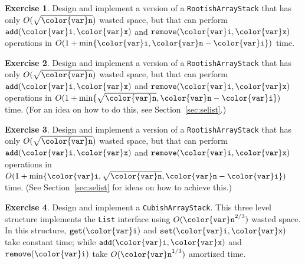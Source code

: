 \documentclass[10pt]{book}
\newcommand{\secref}[1]{Section~\ref{sec:#1}}
\theoremstyle{plain}
\theoremstyle{definition}
\newtheorem{exc}{Exercise}[chapter]
\newcommand{\exclabel}[1]{\label{exc:#1}}
\begin{document}
\begin{exc}
  Design and implement a version of a \texttt{RootishArrayStack} that has
  only $O(\sqrt{\ensuremath{\mathtt{{\color{var}n}}}})$ wasted space, but that can perform \ensuremath{\mathtt{add({\color{var}i},{\color{var}x})}}
  and \ensuremath{\mathtt{remove({\color{var}i},{\color{var}x})}} operations in $O(1+\min\{\ensuremath{\mathtt{{\color{var}i}}},\ensuremath{\mathtt{{\color{var}n}}}-\ensuremath{\mathtt{{\color{var}i}}}\})$ time.
\end{exc}

\begin{exc}\exclabel{rootisharraystack-fast}
  Design and implement a version of a \texttt{RootishArrayStack} that has
  only $O(\sqrt{\ensuremath{\mathtt{{\color{var}n}}}})$ wasted space, but that can perform \ensuremath{\mathtt{add({\color{var}i},{\color{var}x})}}
  and \ensuremath{\mathtt{remove({\color{var}i},{\color{var}x})}} operations in $O(1+\min\{\sqrt{\ensuremath{\mathtt{{\color{var}n}}}},\ensuremath{\mathtt{{\color{var}n}}}-\ensuremath{\mathtt{{\color{var}i}}}\})$
  time. (For an idea on how to do this, see \secref{selist}.)
\end{exc}

\begin{exc}
  Design and implement a version of a \texttt{RootishArrayStack} that has
  only $O(\sqrt{\ensuremath{\mathtt{{\color{var}n}}}})$ wasted space, but that can perform \ensuremath{\mathtt{add({\color{var}i},{\color{var}x})}} and
  \ensuremath{\mathtt{remove({\color{var}i},{\color{var}x})}} operations in $O(1+\min\{\ensuremath{\mathtt{{\color{var}i}}},\sqrt {\ensuremath{\mathtt{{\color{var}n}}}},\ensuremath{\mathtt{{\color{var}n}}}-\ensuremath{\mathtt{{\color{var}i}}}\})$ time.
  (See \secref{selist} for ideas on how to achieve this.)
\end{exc}

\begin{exc}
  Design and implement a \texttt{CubishArrayStack}.
  This three level structure
  implements the \texttt{List} interface using $O(\ensuremath{\mathtt{{\color{var}n}}}^{2/3})$ wasted space.
  In this structure, \ensuremath{\mathtt{get({\color{var}i})}} and \ensuremath{\mathtt{set({\color{var}i},{\color{var}x})}} take constant time; while
  \ensuremath{\mathtt{add({\color{var}i},{\color{var}x})}} and \ensuremath{\mathtt{remove({\color{var}i})}} take $O(\ensuremath{\mathtt{{\color{var}n}}}^{1/3})$ amortized time.
\end{exc}
\end{document}
